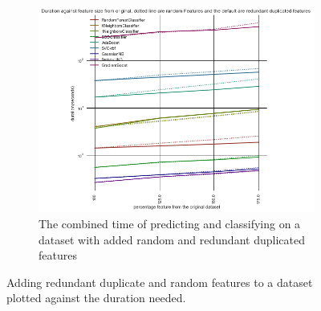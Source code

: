 \documentclass[a4paper,10pt]{article}
\begin{document}
\begin{figure}[H]
\begin{subfigure}[b]{0.45\textwidth}
		\includegraphics[width=\textwidth]{images/scalability/FeatAddDupRand.png}
		\caption{The combined time of predicting and classifying on a dataset with added random and redundant duplicated features}
		\label{fig:SADR}
	\end{subfigure}
	\caption{Adding redundant duplicate and random features to a dataset plotted against the duration needed.}
	\label{fig:ScalableAdded}
\end{figure}
\end{document}

